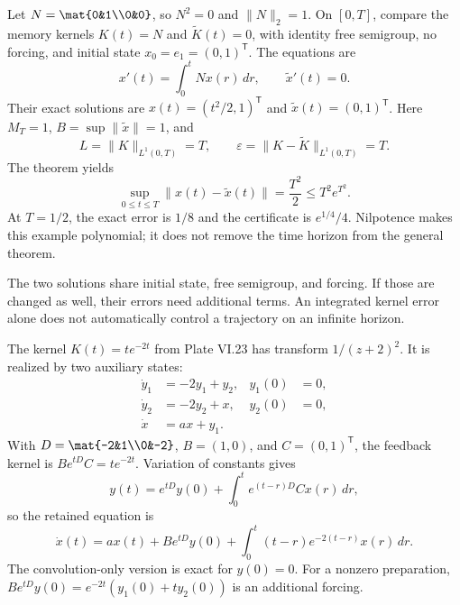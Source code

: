 Let $N=\mat{0&1\\0&0}$, so $N^2=0$ and $\|N\|_2=1$. On $[0,T]$, compare the memory kernels $K(t)=N$ and $\widetilde K(t)=0$, with identity free semigroup, no forcing, and initial state $x_0=e_1=(0,1)^{\mathsf T}$. The equations are
\[
x'(t)=\int_0^t N x(r)\,dr,\qquad
\widetilde x'(t)=0.
\]
Their exact solutions are $x(t)=(t^2/2,1)^{\mathsf T}$ and $\widetilde x(t)=(0,1)^{\mathsf T}$.
Here $M_T=1$, $B=\sup\|\widetilde x\|=1$, and
\[
L=\|K\|_{L^1(0,T)}=T,\qquad
\varepsilon=\|K-\widetilde K\|_{L^1(0,T)}=T.
\]
The theorem yields
\[
\sup_{0\le t\le T}\|x(t)-\widetilde x(t)\|
=\frac{T^2}{2}\le T^2e^{T^2}.
\]
At $T=1/2$, the exact error is $1/8$ and the certificate is $e^{1/4}/4$. Nilpotence makes this example polynomial; it does not remove the time horizon from the general theorem.

The two solutions share initial state, free semigroup, and forcing. If those are changed as well, their errors need additional terms. An integrated kernel error alone does not automatically control a trajectory on an infinite horizon.

The kernel $K(t)=te^{-2t}$ from Plate VI.23 has transform $1/(z+2)^2$. It is realized by two auxiliary states:
\[
\begin{aligned}
\dot y_1&=-2y_1+y_2,& y_1(0)&=0,\\
\dot y_2&=-2y_2+x,& y_2(0)&=0,\\
\dot x&=a x+y_1.&
\end{aligned}
\]
With $D=\mat{-2&1\\0&-2}$, $B=(1,0)$, and $C=(0,1)^{\mathsf T}$, the feedback kernel is $Be^{tD}C=te^{-2t}$.
Variation of constants gives
\[
y(t)=e^{tD}y(0)+\int_0^t e^{(t-r)D}Cx(r)\,dr,
\]
so the retained equation is
\[
\dot x(t)=a x(t)+Be^{tD}y(0)
+\int_0^t (t-r)e^{-2(t-r)}x(r)\,dr.
\]
The convolution-only version is exact for $y(0)=0$. For a nonzero preparation, $Be^{tD}y(0)=e^{-2t}(y_1(0)+t y_2(0))$ is an additional forcing.


